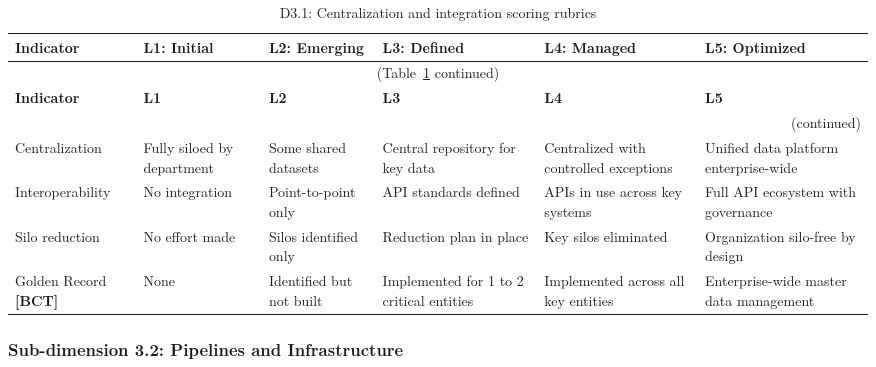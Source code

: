 \begin{center}
{\small
\begin{longtable}{|p{2.4cm}|p{2.0cm}|p{2.0cm}|p{2.2cm}|p{2.2cm}|p{2.2cm}|}
\caption{D3.1: Centralization and integration scoring rubrics} \label{tab:d3-1} \\
\hline
\textbf{Indicator} & \textbf{L1: Initial} & \textbf{L2: Emerging} & \textbf{L3: Defined} & \textbf{L4: Managed} & \textbf{L5: Optimized} \\
\hline
\endfirsthead
\multicolumn{6}{c}{\small (Table~\ref{tab:d3-1} continued)} \\
\hline
\textbf{Indicator} & \textbf{L1} & \textbf{L2} & \textbf{L3} & \textbf{L4} & \textbf{L5} \\
\hline
\endhead
\hline
\multicolumn{6}{r}{\small (continued)} \\
\endfoot
\hline
\endlastfoot
Centralization &
  Fully siloed by department &
  Some shared datasets &
  Central repository for key data &
  Centralized with controlled exceptions &
  Unified data platform enterprise-wide \\
\hline
Interoperability &
  No integration &
  Point-to-point only &
  API standards defined &
  APIs in use across key systems &
  Full API ecosystem with governance \\
\hline
Silo reduction &
  No effort made &
  Silos identified only &
  Reduction plan in place &
  Key silos eliminated &
  Organization silo-free by design \\
\hline
Golden Record \textbf{[BCT]} &
  None &
  Identified but not built &
  Implemented for 1 to 2 critical entities &
  Implemented across all key entities &
  Enterprise-wide master data management \\
\hline
\end{longtable}
}
\end{center}

\subsubsection*{Sub-dimension 3.2: Pipelines and Infrastructure}

